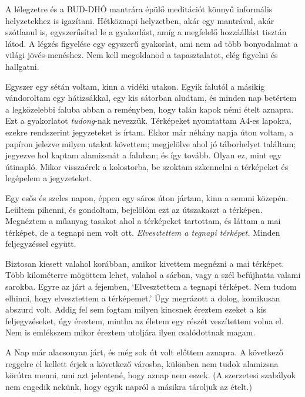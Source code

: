 A lélegzetre és a BUD-DHÓ mantrára épülő meditációt könnyű informális
helyzetekhez is igazítani. Hétköznapi helyzetben, akár egy mantrával,
akár szótlanul is, egyszerűsítsd le a gyakorlást, amíg a megfelelő
hozzáállást tisztán látod. A légzés figyelése egy egyszerű gyakorlat,
ami nem ad több bonyodalmat a világi jövés-menéshez. Nem kell megoldanod
a tapasztalatot, elég figyelni és hallgatni.


Egyszer egy sétán voltam, kinn a vidéki utakon. Egyik falutól a másikig
vándoroltam egy hátizsákkal, egy kis sátorban aludtam, és minden nap
betértem a legközelebbi faluba abban a reményben, hogy talán kapok némi
ételt aznapra. Ezt a gyakorlatot \emph{tudong}-nak nevezzük. Térképeket
nyomtattam A4-es lapokra, ezekre rendszerint jegyzeteket is írtam. Ekkor
már néhány napja úton voltam, a papíron jelezve milyen utakat követtem;
megjelölve ahol jó táborhelyet találtam; jegyezve hol kaptam alamizsnát
a faluban; és így tovább. Olyan ez, mint egy útinapló. Mikor visszaérek
a kolostorba, be szoktam szkennelni a térképeket és legépelem a
jegyzeteket.

\enlargethispage*{\baselineskip}

Egy esős és szeles napon, éppen egy sáros úton jártam, kinn a semmi
közepén. Leültem pihenni, és gondoltam, bejelölöm ezt az útszakaszt a
térképen. Megnéztem a műanyag tasakot ahol a térképeket tartottam, és
láttam a mai térképet, de a tegnapi nem volt ott. \emph{Elvesztettem a
tegnapi térképet.} Minden feljegyzéssel együtt.

Biztosan kiesett valahol korábban, amikor kivettem megnézni a mai
térképet. Több kilométerre mögöttem lehet, valahol a sárban, vagy a szél
befújhatta valami sarokba. Egyre az járt a fejemben, `Elvesztettem a
tegnapi térképet. Nem tudom elhinni, hogy elvesztettem a térképemet.'
Úgy megrázott a dolog, komikusan abszurd volt. Addig fel sem fogtam
milyen kincsnek éreztem ezeket a kis feljegyzéseket, úgy éreztem, mintha
az életem egy részét veszítettem volna el. Nem is emlékszem mikor
éreztem utoljára ilyen csalódottnak magam.

A Nap már alacsonyan járt, és még sok út volt előttem aznapra. A
következő reggelre el kellett érjek a következő városba, különben nem
tudok alamizsna körútra menni, ami azt jelentené, hogy aznap nem eszek.
(A szerzetesi szabályok nem engedik nekünk, hogy egyik napról a másikra
tároljuk az ételt.)


